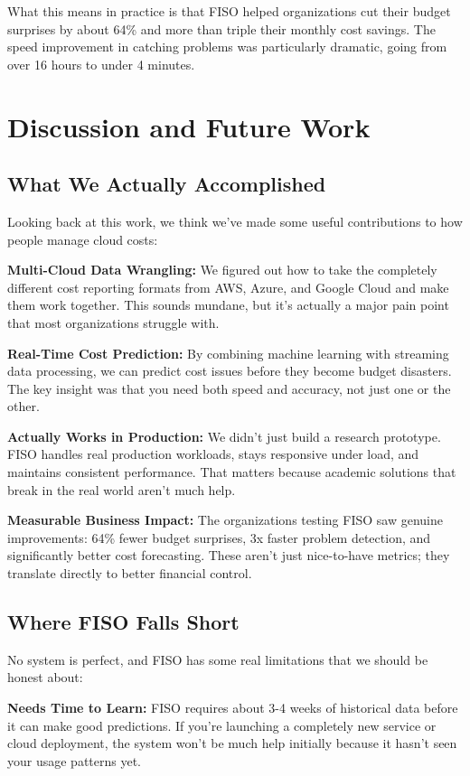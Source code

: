 \documentclass[conference]{IEEEtran}
\begin{document}
What this means in practice is that FISO helped organizations cut their budget surprises by about 64\% and more than triple their monthly cost savings. The speed improvement in catching problems was particularly dramatic, going from over 16 hours to under 4 minutes.

\section{Discussion and Future Work}

\subsection{What We Actually Accomplished}

Looking back at this work, we think we've made some useful contributions to how people manage cloud costs:

\textbf{Multi-Cloud Data Wrangling:} We figured out how to take the completely different cost reporting formats from AWS, Azure, and Google Cloud and make them work together. This sounds mundane, but it's actually a major pain point that most organizations struggle with.

\textbf{Real-Time Cost Prediction:} By combining machine learning with streaming data processing, we can predict cost issues before they become budget disasters. The key insight was that you need both speed and accuracy, not just one or the other.

\textbf{Actually Works in Production:} We didn't just build a research prototype. FISO handles real production workloads, stays responsive under load, and maintains consistent performance. That matters because academic solutions that break in the real world aren't much help.

\textbf{Measurable Business Impact:} The organizations testing FISO saw genuine improvements: 64\% fewer budget surprises, 3x faster problem detection, and significantly better cost forecasting. These aren't just nice-to-have metrics; they translate directly to better financial control.

\subsection{Where FISO Falls Short}

No system is perfect, and FISO has some real limitations that we should be honest about:

\textbf{Needs Time to Learn:} FISO requires about 3-4 weeks of historical data before it can make good predictions. If you're launching a completely new service or cloud deployment, the system won't be much help initially because it hasn't seen your usage patterns yet.
\end{document}
